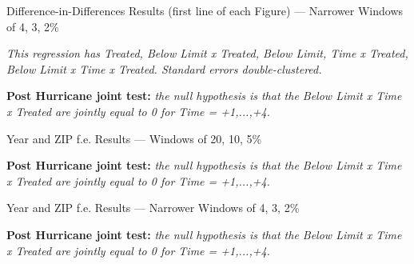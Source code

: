 \documentclass{article}
\begin{document}
\clearpage
\pagebreak
    
\begin{sidewaystable}
        
    \caption{Difference-in-Differences Results (first line of each Figure)  --- Narrower Windows of 4, 3, 2\%}
    \emph{This regression has Treated, Below Limit x Treated, Below Limit, Time x Treated, Below Limit x Time x Treated. Standard errors double-clustered.}
        
    \begin{center}
    
    \end{center}
        
    \textbf{Post Hurricane joint test:} \emph{the null hypothesis is that the Below Limit x Time x Treated are jointly equal to 0 for Time = +1,...,+4.}

\end{sidewaystable}

\clearpage
\pagebreak

\begin{sidewaystable}
    
    \caption{Year and ZIP f.e. Results --- Windows of 20, 10, 5\%}
        
    \begin{center}
    
    \end{center}
        
    \textbf{Post Hurricane joint test:} \emph{the null hypothesis is that the Below Limit x Time x Treated are jointly equal to 0 for Time = +1,...,+4.}

\end{sidewaystable}
        
\clearpage
\pagebreak
        
\begin{sidewaystable}
            
    \caption{Year and ZIP f.e. Results --- Narrower Windows of 4, 3, 2\%}
            
    \begin{center}
    
    \end{center}
            
    \textbf{Post Hurricane joint test:} \emph{the null hypothesis is that the Below Limit x Time x Treated are jointly equal to 0 for Time = +1,...,+4.}

\end{sidewaystable}
\end{document}
